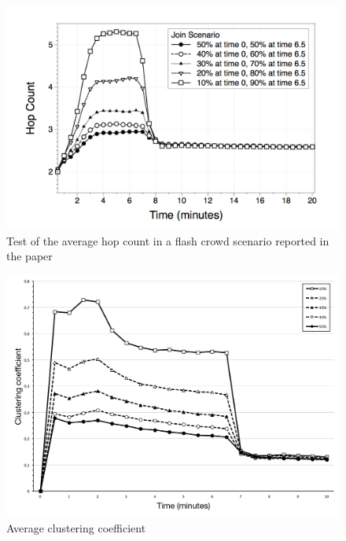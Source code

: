\begin{figure}[ht]
  \centering
  \includegraphics[keepaspectratio=true, width=\textwidth]{images/paper_average_hop_count_flash_crowd}\caption{Test of the average hop count in a flash crowd scenario reported in the paper}
  \label{fig:paper_average_hop_count_flash_crowd}
\end{figure}

\begin{figure}[ht]
  \centering
  \includegraphics[keepaspectratio=true, width=\textwidth]{images/average_clustering_coefficient}\caption{Average clustering coefficient}
  \label{fig:average_clustering_coefficient}
\end{figure}

